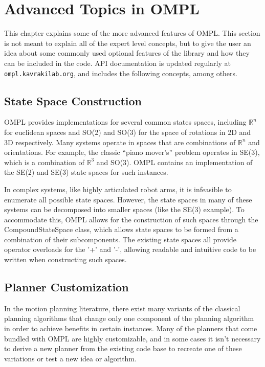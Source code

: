 \chapter{Advanced Topics in OMPL}

This chapter explains some of the more advanced features of OMPL.  This section
is not meant to explain all of the expert level concepts, but to give the user
an idea about some commonly used optional features of the library and how they
can be included in the code.  API documentation is updated regularly at
{\tt ompl.kavrakilab.org}, and includes the following concepts, among others.

\section {State Space Construction}
OMPL provides implementations for several common states spaces, including
${\mathbb R}^n$ for euclidean spaces and SO(2) and SO(3) for the space of 
rotations in 2D and 3D respectively.  Many systems operate in spaces
that are combinations of ${\mathbb R}^n$ and orientations.  For example, the 
classic ``piano mover's'' problem operates in SE(3), which is a combination
of ${\mathbb R}^3$ and SO(3).  OMPL contains an implementation of the SE(2) and
SE(3) state spaces for such instances.  

In complex systems, like highly articulated robot arms, it is infeasible to 
enumerate all possible state spaces.  However, the state spaces in many of these
systems can be decomposed into smaller spaces (like the SE(3) example).  To 
accommodate this, OMPL allows for the construction of such spaces through the 
CompoundStateSpace class, which allows state spaces to be formed from a 
combination of their subcomponents.  The existing state spaces all provide 
operator overloads for the '+' and '-', allowing readable and intuitive code to
be written when constructing such spaces.

\section {Planner Customization}
In the motion planning literature, there exist many variants of the classical
planning algorithms that change only one component of the planning algorithm 
in order to achieve benefits in certain instances.  Many of the planners that 
come bundled with OMPL are highly customizable, and in some cases it isn't 
necessary to derive a new planner from the existing code base to recreate one of
these variations or test a new idea or algorithm.

